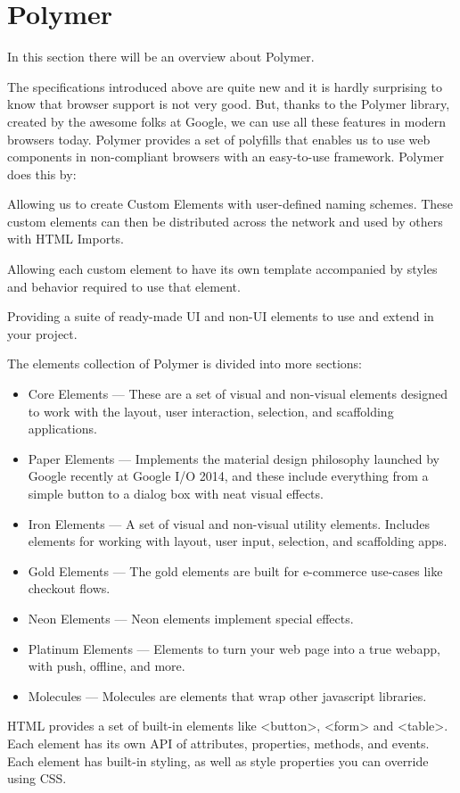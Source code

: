 \section{Polymer}
\label{sec:TCH_polymer}

In this section there will be an overview about Polymer.

The specifications introduced above are quite new and it is hardly surprising to know that browser support is not very good. But, thanks to the Polymer library, created by the awesome folks at Google, we can use all these features in modern browsers today. Polymer provides a set of polyfills that enables us to use web components in non-compliant browsers with an easy-to-use framework. Polymer does this by:

Allowing us to create Custom Elements with user-defined naming schemes. These custom elements can then be distributed across the network and used by others with HTML Imports.

Allowing each custom element to have its own template accompanied by styles and behavior required to use that element.

Providing a suite of ready-made UI and non-UI elements to use and extend in your project.

The elements collection of Polymer is divided into more sections:

\begin{itemize}

\item Core Elements — These are a set of visual and non-visual elements designed to work with the layout, user interaction, selection, and scaffolding applications.
\item Paper Elements — Implements the material design philosophy launched by Google recently at Google I/O 2014, and these include everything from a simple button to a dialog box with neat visual effects.
\item Iron Elements — A set of visual and non-visual utility elements. Includes elements for working with layout, user input, selection, and scaffolding apps.
\item Gold Elements — The gold elements are built for e-commerce use-cases like checkout flows.
\item Neon Elements — Neon elements implement special effects.
\item Platinum Elements — Elements to turn your web page into a true webapp, with push, offline, and more.
\item Molecules — Molecules are elements that wrap other javascript libraries.
\end{itemize}
HTML provides a set of built-in elements like <button>, <form> and <table>. Each element has its own API of attributes, properties, methods, and events. Each element has built-in styling, as well as style properties you can override using CSS.

